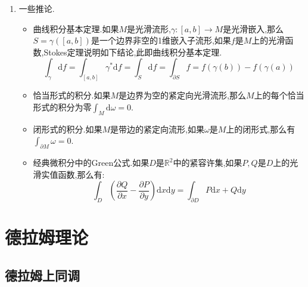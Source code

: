 \begin{enumerate}
\begin{proof}
		最后设$\omega$是任意的具有紧支集的$n-1$形式,选取$\mathrm{Supp}\omega$的由正定向或者负定向坐标卡$\{U_i\}$构成的有限开覆盖,选取对应的单位分解$\{\psi_i\}$,那么有如下等式成立,这完成证明.
		\begin{align*}
		\int_{\partial M}\omega&=\sum_i\int_{\partial M}\psi_i\omega=\sum_i\int_M\mathrm{d}(\psi_i\omega)=\sum_i\int_M\mathrm{d}\psi_i\wedge\omega+\psi_i\mathrm{d}\omega\\&=\int_M\mathrm{d}(\sum_i\psi)\wedge\omega+\int_M(\sum_i\psi_i)\mathrm{d}\omega=\int_M\mathrm{d}\omega
		\end{align*}		
	\end{proof}
	\item 一些推论.
	\begin{itemize}
		\item 曲线积分基本定理.如果$M$是光滑流形,$\gamma:[a,b]\to M$是光滑嵌入,那么$S=\gamma([a,b])$是一个边界非空的1维嵌入子流形,如果$f$是$M$上的光滑函数,Stokes定理说明如下结论,此即曲线积分基本定理.
		$$\int_{\gamma}\mathrm{d}f=\int_{[a,b]}\gamma^*\mathrm{d}f=\int_S\mathrm{d}f=\int_{\partial S}f=f(\gamma(b))-f(\gamma(a))$$
		\item 恰当形式的积分.如果$M$是边界为空的紧定向光滑流形,那么$M$上的每个恰当形式的积分为零$\int_M\mathrm{d}\omega=0$.
		\item 闭形式的积分.如果$M$是带边的紧定向流形,如果$\omega$是$M$上的闭形式,那么有$\int_{\partial M}\omega=0$.
		\item 经典微积分中的Green公式.如果$D$是$\mathbb{R}^2$中的紧容许集,如果$P,Q$是$D$上的光滑实值函数,那么有:$$\int_D\left(\frac{\partial Q}{\partial x}-\frac{\partial P}{\partial y}\right)\mathrm{d}x\mathrm{d}y=\int_{\partial D}P\mathrm{d}x+Q\mathrm{d}y$$
	\end{itemize}
\end{enumerate}

\newpage
\section{德拉姆理论}
\subsection{德拉姆上同调}

